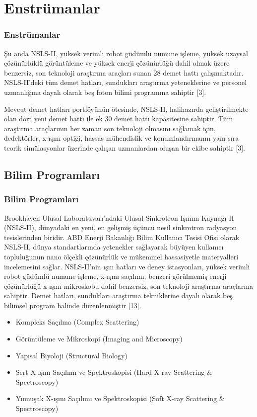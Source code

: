 \documentclass[aspectratio=169,10pt]{beamer}
\begin{document}
\section{Enstrümanlar}	
\begin{frame}[allowframebreaks]
\frametitle{Enstrümanlar}

Şu anda NSLS-II, yüksek verimli robot güdümlü numune işleme, yüksek uzaysal çözünürlüklü görüntüleme ve yüksek enerji çözünürlüğü dahil olmak üzere benzersiz, son teknoloji araştırma araçları sunan 28 demet hattı çalışmaktadır. NSLS-II'deki tüm demet hatları, sundukları araştırma yeteneklerine ve personel uzmanlığına dayalı olarak beş foton bilimi programına sahiptir [3].

Mevcut demet hatları portföyünün ötesinde, NSLS-II, halihazırda geliştirilmekte olan dört yeni demet hattı ile ek 30 demet hattı kapasitesine sahiptir. Tüm araştırma araçlarının her zaman son teknoloji olmasını sağlamak için, dedektörler, x-ışını optiği, hassas mühendislik ve konumlandırmanın yanı sıra teorik simülasyonlar üzerinde çalışan uzmanlardan oluşan bir ekibe sahiptir [3].

\end{frame}


\subsection{Bilim Programları}
\begin{frame}[allowframebreaks]
\frametitle{Bilim Programları}

Brookhaven Ulusal Laboratuvarı'ndaki Ulusal Sinkrotron Işınım Kaynağı II (NSLS-II), dünyadaki en yeni, en gelişmiş üçüncü nesil sinkrotron radyasyon tesislerinden biridir. ABD Enerji Bakanlığı Bilim Kullanıcı Tesisi Ofisi olarak NSLS-II, dünya standartlarında yetenekler sağlayarak büyüyen kullanıcı topluluğunun nano ölçekli çözünürlük ve mükemmel hassasiyetle materyalleri incelemesini sağlar. NSLS-II'nin ışın hatları ve deney istasyonları, yüksek verimli robot güdümlü numune işleme, x-ışını saçılımı, benzeri görülmemiş enerji çözünürlüğü x-ışını mikroskobu dahil benzersiz, son teknoloji araştırma araçlarına sahiptir. Demet hatları, sundukları araştırma tekniklerine dayalı olarak beş bilimsel program halinde düzenlenmiştir [13].

\begin{itemize}
    \item Kompleks Saçılma (Complex Scattering)
    
    \item Görüntüleme ve Mikroskopi (Imaging and Microscopy)
    
    \item Yapısal Biyoloji (Structural Biology)
    
    \item Sert X-ışını Saçılımı ve Spektroskopisi (Hard X-ray Scattering \& Spectroscopy) 
    
    \item Yumuşak X-ışını Saçılımı ve Spektroskopisi (Soft X-ray Scattering \& Spectroscopy) 
\end{itemize}

\end{frame}
\end{document}
